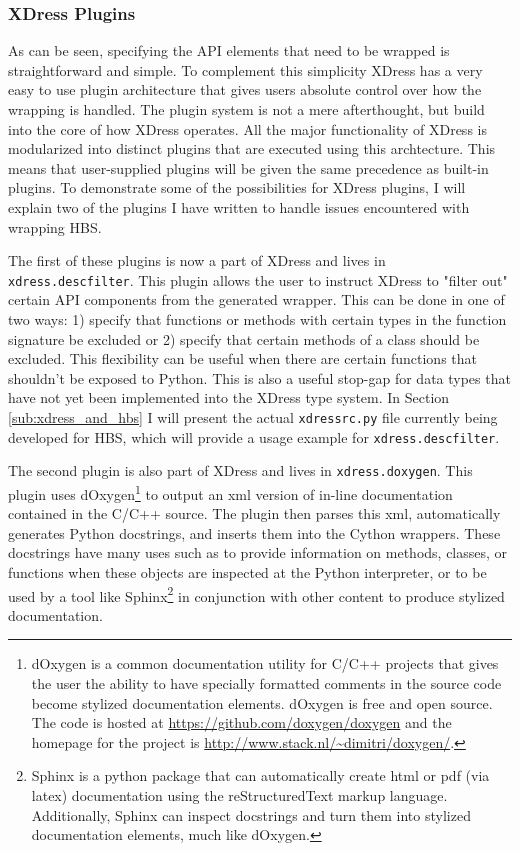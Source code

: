   \subsubsection{XDress Plugins} \label{ssub:xdress_plugins}

    As can be seen, specifying the API elements that need to be wrapped is straightforward and simple. To complement this simplicity XDress has a very easy to use plugin architecture that gives users absolute control over how the wrapping is handled. The plugin system is not a mere afterthought, but build into the core of how XDress operates. All the major functionality of XDress is modularized into distinct plugins that are executed using this archtecture. This means that user-supplied plugins will be given the same precedence as built-in plugins. To demonstrate some of the possibilities for XDress plugins, I will explain two of the plugins I have written to handle issues encountered with wrapping HBS.

    The first of these plugins is now a part of XDress and lives in \texttt{xdress.descfilter}. This plugin allows the user to instruct XDress to "filter out" certain API components from the generated wrapper. This can be done in one of two ways: 1) specify that functions or methods with certain types in the function signature be excluded or 2) specify that certain methods of a class should be excluded. This flexibility can be useful when there are certain functions that shouldn't be exposed to Python. This is also a useful stop-gap for data types that have not yet been implemented into the XDress type system. In Section \ref{sub:xdress_and_hbs} I will present the actual \texttt{xdressrc.py} file currently being developed for HBS, which will provide a usage example for \texttt{xdress.descfilter}.

    The second plugin is also part of XDress and lives in  \texttt{xdress.doxygen}. This plugin uses dOxygen\footnote{dOxygen is a common documentation utility for C/C++ projects that gives the user the ability to have specially formatted comments in the source code become stylized documentation elements. dOxygen is free and open source. The code is hosted at \url{https://github.com/doxygen/doxygen} and the homepage for the project is \url{http://www.stack.nl/~dimitri/doxygen/}.} to output an xml version of in-line documentation contained in the C/C++ source. The plugin then parses this xml, automatically generates Python docstrings, and inserts them into the Cython wrappers. These docstrings have many uses such as to provide information on methods, classes, or functions when these objects are inspected at the Python interpreter, or to be used by a tool like Sphinx\footnote{Sphinx is a python package that can automatically create html or pdf (via latex) documentation using the reStructuredText markup language. Additionally, Sphinx can inspect docstrings and turn them into stylized documentation elements, much like dOxygen.} in conjunction with other content to produce stylized documentation.

